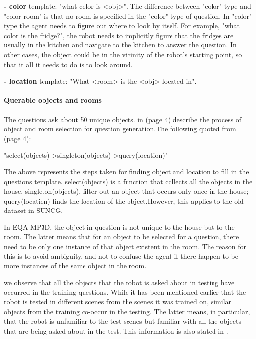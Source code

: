 \textbf{- color} template: "what color is <obj>". The difference between "color" type and "color room" is that no room is specified in the "color" type of question. In "color" type the agent needs to figure out where to look by itself. For example, "what color is the fridge?", the robot needs to implicitly figure that the fridges are usually in the kitchen and navigate to the kitchen to answer the question. In other cases, the object could be in the vicinity of the robot's starting point, so that it all it needs to do is to look around. 

\textbf{- location} template: "What <room> is the <obj> located in". 

\paragraph{Querable objects and rooms}

The questions ask about 50 unique objects. \cite{embodiedqa} in (page 4) describe the process of object and room selection for question generation.The following quoted from (page 4): 

"select(objects)->singleton(objects)->query(location)"

The above represents the steps taken for finding object and location to fill in the questions template. select(objects) is a function that collects all the objects in the house. singleton(objects), filter out an object that occurs only once in the house; query(location) finds the location of the object.However, this applies to the old dataset in SUNCG.

In EQA-MP3D, the object in question is not unique to the house but to the room. The latter means that for an object to be selected for a question, there need to be only one instance of that object existent in the room. The reason for this is to avoid ambiguity, and not to confuse the agent if there happen to be more instances of the same object in the room. 

we observe that all the objects that the robot is asked about in testing have occurred in the training questions. While it has been mentioned earlier that the robot is tested in different scenes from the scenes it was trained on, similar objects from the training co-occur in the testing. The latter means, in particular, that the robot is unfamiliar to the test scenes but familiar with all the objects that are being asked about in the test. This information is also stated in \cite{eqa_matterport}. 


